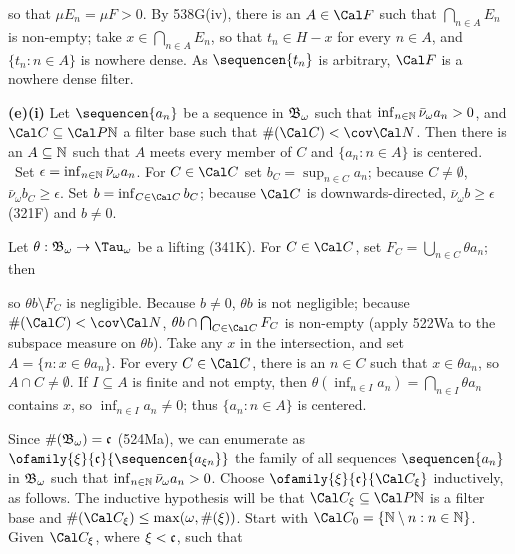 {

\noindent so that $\mu E_n=\mu F>0$.   By 538G(iv), there is an
$A\in\Cal F$ such that $\bigcap_{n\in A}E_n$ is non-empty;  take
$x\in\bigcap_{n\in A}E_n$, so that $t_n\in H-x$ for every $n\in A$, and
$\{t_n:n\in A\}$ is nowhere dense.
As $\sequencen{t_n}$ is arbitrary, $\Cal F$ is a nowhere dense filter.

\medskip

{\bf (e)(i)} Let $\sequencen{a_n}$ be a sequence in
$\frak B_{\omega}$ such that $\inf_{n\in\Bbb N}\bar\nu_{\omega}a_n>0$, and
$\Cal C\subseteq\Cal P\Bbb N$ a filter base such that
$\#(\Cal C)<\cov\Cal N$.   Then there is an $A\subseteq\Bbb N$ such that
$A$ meets every member of $C$ and
$\{a_n:n\in A\}$ is centered.   \Prf\ Set
$\epsilon=\inf_{n\in\Bbb N}\bar\nu_{\omega}a_n$.
For $C\in\Cal C$ set $b_C=\sup_{n\in C}a_n$;  because $C\ne\emptyset$,
$\bar\nu_{\omega}b_C\ge\epsilon$.
Set $b=\inf_{C\in\Cal C}b_C$;  because $\Cal C$ is downwards-directed,
$\bar\nu_{\omega}b\ge\epsilon$ (321F) and $b\ne 0$.

Let $\theta:\frak B_{\omega}\to\Tau_{\omega}$ be a lifting (341K).   For
$C\in\Cal C$, set $F_C=\bigcup_{n\in C}\theta a_n$;  then


\noindent so $\theta b\setminus F_C$ is negligible.   Because
$b\ne 0$, $\theta b$ is not negligible;  because
$\#(\Cal C)<\cov\Cal N$, $\theta b\cap\bigcap_{C\in\Cal C}F_C$ is non-empty
(apply 522Wa to the subspace measure on $\theta b$).   Take any $x$ in the
intersection, and set $A=\{n:x\in\theta a_n\}$.   For every $C\in\Cal C$,
there is an $n\in C$ such that $x\in\theta a_n$, so $A\cap C\ne\emptyset$.
If $I\subseteq A$ is finite and not empty, then
$\theta(\inf_{n\in I}a_n)=\bigcap_{n\in I}\theta a_n$ contains $x$, so
$\inf_{n\in I}a_n\ne 0$;  thus $\{a_n:n\in A\}$ is centered.\ \Qed

\medskip

 Since $\#(\frak B_{\omega})=\frak c$ (524Ma), we can
enumerate as $\ofamily{\xi}{\frak c}{\sequencen{a_{\xi n}}}$ the family of
all sequences $\sequencen{a_n}$ in $\frak B_{\omega}$ such that
$\inf_{n\in\Bbb N}\bar\nu_{\omega}a_n>0$.   Choose
$\ofamily{\xi}{\frak c}{\Cal C_{\xi}}$ inductively, as follows.
The inductive hypothesis will be that $\Cal C_{\xi}\subseteq\Cal P\Bbb N$
is a filter base and $\#(\Cal C_{\xi})\le\max(\omega,\#(\xi))$.
Start with $\Cal C_0=\{\Bbb N\setminus n:n\in\Bbb N\}$.
Given $\Cal C_{\xi}$, where $\xi<\frak c$, such that

}
